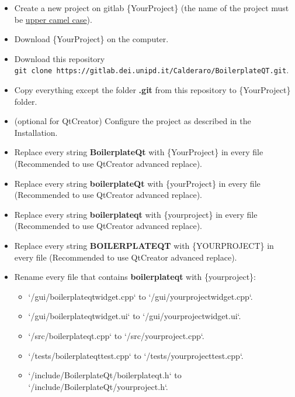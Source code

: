 \begin{itemize}
      \tightlist
      \item
            Create a new project on gitlab \{YourProject\} (the name of the
            project must be \href{https://en.wikipedia.org/wiki/Camel_case}{upper
                  camel case}).
      \item
            Download \{YourProject\} on the computer.
      \item
            Download this repository
            \texttt{git\ clone\ https://gitlab.dei.unipd.it/Calderaro/BoilerplateQT.git}.
      \item
            Copy everything except the folder \textbf{.git} from this repository
            to \{YourProject\} folder.
      \item
            (optional for QtCreator) Configure the project as described in the
            Installation.
      \item
            Replace every string \textbf{BoilerplateQt} with \{YourProject\} in
            every file (Recommended to use QtCreator advanced replace).
      \item
            Replace every string \textbf{boilerplateQt} with \{yourProject\} in
            every file (Recommended to use QtCreator advanced replace).
      \item
            Replace every string \textbf{boilerplateqt} with \{yourproject\} in
            every file (Recommended to use QtCreator advanced replace).
      \item
            Replace every string \textbf{BOILERPLATEQT} with \{YOURPROJECT\} in
            every file (Recommended to use QtCreator advanced replace).
      \item
            Rename every file that contains \textbf{boilerplateqt} with
            \{yourproject\}:
            \begin{itemize}
                  \tightlist
                  \item
                        `/gui/boilerplateqtwidget.cpp` to `/gui/{yourproject}widget.cpp`.

                  \item
                        `/gui/boilerplateqtwidget.ui` to `/gui/{yourproject}widget.ui`.

                  \item
                        `/src/boilerplateqt.cpp` to `/src/{yourproject}.cpp`.

                  \item
                        `/tests/boilerplateqttest.cpp` to `/tests/{yourproject}test.cpp`.

                  \item
                        `/include/BoilerplateQt/boilerplateqt.h` to `/include/BoilerplateQt/{yourproject}.h`.
            \end{itemize}
\end{itemize}


